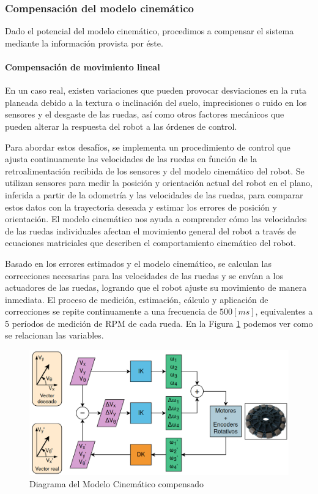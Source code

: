 \subsubsection{Compensación del modelo cinemático}

Dado el potencial del modelo cinemático, procedimos a compensar el sistema mediante la información provista por éste.

\paragraph{Compensación de movimiento lineal} \mbox{} \vspace{8pt}

En un caso real, existen variaciones que pueden provocar desviaciones en la ruta planeada debido a la textura o inclinación del suelo, imprecisiones o ruido en los sensores y el desgaste de las ruedas, así como otros factores mecánicos que pueden alterar la respuesta del robot a las órdenes de control.

Para abordar estos desafíos, se implementa un procedimiento de control que ajusta continuamente las velocidades de las ruedas en función de la retroalimentación recibida de los sensores y del modelo cinemático del robot. Se utilizan sensores para medir la posición y orientación actual del robot en el plano, inferida a partir de la odometría y las velocidades de las ruedas, para comparar estos datos con la trayectoria deseada y estimar los errores de posición y orientación. El modelo cinemático nos ayuda a  comprender cómo las velocidades de las ruedas individuales afectan el movimiento general del robot a través de ecuaciones matriciales que describen el comportamiento cinemático del robot.

Basado en los errores estimados y el modelo cinemático, se calculan las correcciones necesarias para las velocidades de las ruedas y se envían a los actuadores de las ruedas, logrando que el robot ajuste su movimiento de manera inmediata. \cite{rijalusalamkinematics} El proceso de medición, estimación, cálculo y aplicación de correcciones se repite continuamente a una frecuencia de $500[ms]$, equivalentes a 5 períodos de medición de RPM de cada rueda. En la Figura \ref{fig:diagramamodelocinemcompensado} podemos ver como se relacionan las variables.

\begin{figure}[htb]
    \centering
    \includegraphics[width=0.9\linewidth]{images/diag_compensacion_modelo_cinem.png}
    \caption{Diagrama del Modelo Cinemático compensado}
    \label{fig:diagramamodelocinemcompensado}
\end{figure}

